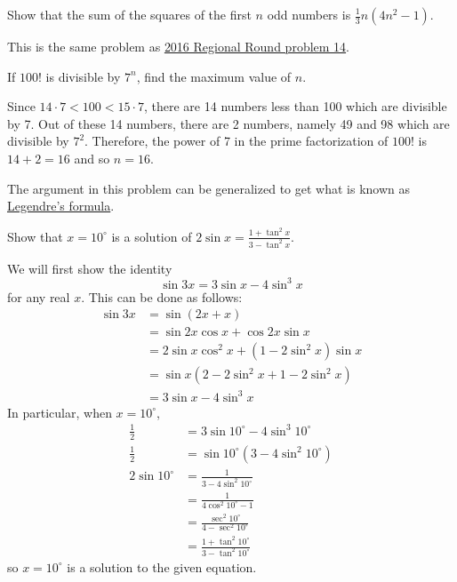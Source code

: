 \begin{question}
    Show that the sum of the squares of the first $n$ odd numbers is
    $\frac{1}{3}n(4n^2 - 1)$.
\end{question}
\begin{solution}
    This is the same problem as \hyperref[sol: 2016 Regional Round P14]{2016
    Regional Round problem 14}. 
\end{solution}

\begin{question}
    If $100!$ is divisible by $7^{n}$, find the maximum value of $n$. 
\end{question}
\begin{solution}
    Since $14 \cdot 7 < 100 < 15 \cdot 7$, there are 14 numbers less than 100
    which are divisible by 7. Out of these 14 numbers, there are 2 numbers,
    namely 49 and 98 which are divisible by $7^2$. Therefore, the power of 7 in
    the prime factorization of $100!$ is $14 + 2 = 16$ and so $n = 16$.
\end{solution}
\begin{remark}
    The argument in this problem can be generalized to get what is known as
    \hyperref[thm: legendre]{Legendre's formula}.
\end{remark}

\begin{question}
    Show that $x = 10^\circ$ is a solution of $2\sin x=\frac{1 + \tan^2x}{3 -
    \tan^2x}$.
\end{question}
\begin{solution}
    We will first show the identity
    \[ \sin 3x = 3\sin x - 4\sin^3 x \]
    for any real $x$. This can be done as follows:
    \begin{align*}
        \sin 3x &= \sin(2x + x)\\
        &= \sin 2x \cos x + \cos 2x \sin x\\
        &= 2\sin x \cos^2 x + (1 - 2\sin^2 x)\sin x\\
        &= \sin x (2 - 2\sin^2 x + 1 - 2\sin^2 x)\\
        &= 3\sin x - 4\sin^3 x
    \end{align*}
    In particular, when $x = 10^\circ$,
    \begin{align*} 
        \frac{1}{2} &= 3\sin 10^\circ - 4\sin^3 10^\circ\\
        \frac{1}{2} &= \sin 10^\circ (3 - 4\sin^2 10^\circ)\\
        2 \sin 10^\circ &= \frac{1}{3 - 4\sin^2 10^\circ}\\
        &= \frac{1}{4\cos^2 10^\circ - 1}\\
        &= \frac{\sec^2 10^\circ}{4 - \sec^2 10^\circ}\\
        &= \frac{1 + \tan^2 10^\circ}{3 - \tan^2 10^\circ}
    \end{align*}
    so $x = 10^\circ$ is a solution to the given equation.
\end{solution}

